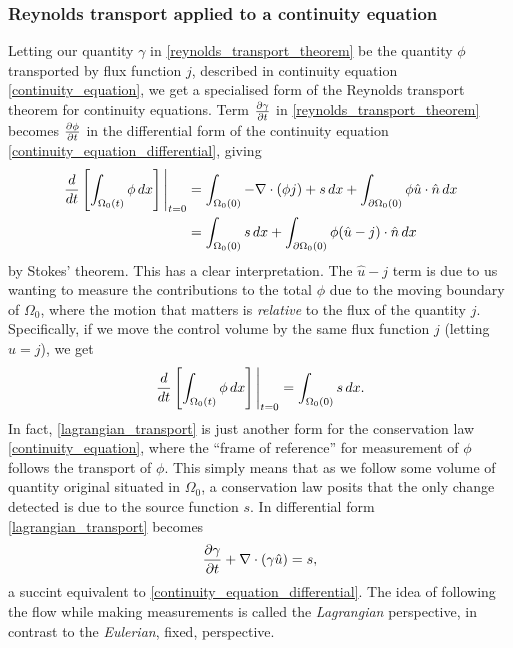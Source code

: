 \subsubsection{Reynolds transport applied to a continuity equation}
Letting our quantity $\gamma$ in \eqref{reynolds_transport_theorem} be the quantity $\phi$ transported by flux function $j$,
described in continuity equation \eqref{continuity_equation}, we get a specialised form of the Reynolds transport theorem for continuity equations.
Term $\frac{\partial \gamma}{\partial t}$ in \eqref{reynolds_transport_theorem} becomes $\frac{\partial \phi}{\partial t}$ in the differential form of the continuity equation \eqref{continuity_equation_differential}, giving
\begin{equation}\label{reynolds_transport_continuity_equation}
\begin{split}
    \eval{\frac{d}{dt}\left[\int_{\Omega_0(t)}\phi\,dx\right]}_{t=0}
        &= \int_{\Omega_0(0)}-\nabla\cdot(\phi j) + s\,dx + \int_{\partial\Omega_0(0)}\phi \hat{u}\cdot\hat{n} \,dx \\
        &= \int_{\Omega_0(0)}s\,dx + \int_{\partial\Omega_0(0)}\phi (\hat{u} - j)\cdot\hat{n} \,dx
\end{split}
\end{equation}
by Stokes' theorem. This has a clear interpretation.
The $\hat{u} - j$ term is due to us wanting to measure the contributions to the total $\phi$ due to the moving boundary of
$\Omega_0$, where the motion that matters is \textit{relative} to the flux of the quantity $j$. Specifically, if we move the control volume by
the same flux function $j$ (letting $\hat{u} = j$), we get
\begin{equation}\label{lagrangian_transport}
    \eval{\frac{d}{dt}\left[\int_{\Omega_0(t)}\phi\,dx\right]}_{t=0}
        = \int_{\Omega_0(0)}s\,dx.
\end{equation}
In fact, \eqref{lagrangian_transport} is just another form for the conservation law \eqref{continuity_equation},
where the ``frame of reference'' for measurement of $\phi$ follows the transport of $\phi$. This simply means that as we follow some volume of quantity
original situated in $\Omega_0$, a conservation law posits that the only change detected is due to the source function $s$. In differential form
\eqref{lagrangian_transport} becomes
\begin{equation}\label{lagrangian_transport_differential}
    \frac{\partial \gamma}{\partial t} + \nabla \cdot(\gamma \hat{u}) = s,
\end{equation}
a succint equivalent to \eqref{continuity_equation_differential}.
The idea of following the flow while making measurements is called the \textit{Lagrangian} perspective, in contrast to the \textit{Eulerian}, fixed, perspective.
